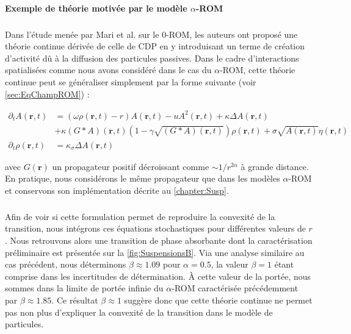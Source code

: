 \paragraph{Exemple de théorie motivée par le modèle $\alpha$-ROM}

\subparagraph{}Dans l'étude menée par Mari et al. \cite{mari_absorbing_2022} sur le $0$-ROM, les auteurs ont proposé une théorie continue dérivée de celle de CDP en y introduisant un terme de création d'activité dû à la diffusion des particules passives. Dans le cadre d'interactions spatialisées comme nous avons considéré dans le cas du $\alpha$-ROM, cette théorie continue peut se généraliser simplement par la forme suivante (voir \autoref{sec:EqChampROM}) :

\begin{equation}
    \begin{aligned}
        \partial_t A (\mathbf{r}, t) &= \left(\omega \rho (\mathbf{r}, t)-r\right) A (\mathbf{r}, t) - uA^2 (\mathbf{r}, t) +\kappa \Delta A (\mathbf{r}, t)\\
        &+ \kappa \left(G\ast A \right)(\mathbf{r}, t)\left(1-\gamma \sqrt{ \left(G\ast A \right)(\mathbf{r}, t)}\right)\rho (\mathbf{r}, t)+ \sigma \sqrt{A (\mathbf{r}, t)}\eta (\mathbf{r}, t)\\
        \partial_t \rho (\mathbf{r}, t) &= \kappa_\sigma \Delta A (\mathbf{r}, t)
    \end{aligned}
\label{eq:SuspensionsB}
\end{equation}

\noindent avec $G(\mathbf{r})$ un propagateur positif décroissant comme $\sim 1/r^{2\alpha}$ à grande distance. En pratique, nous considérons le même propagateur que dans les modèles $\alpha$-ROM et conservons son implémentation décrite au \autoref{chapter:Susp}.

\subparagraph{}Afin de voir si cette formulation permet de reproduire la convexité de la transition, nous intégrons ces équations stochastiques pour différentes valeurs de $r$. Nous retrouvons alors une transition de phase absorbante dont la caractérisation préliminaire est présentée sur la \autoref{fig:SuspensionsB}. Via une analyse similaire au cas précédent, nous déterminons $\beta \approx 1.09$ pour $\alpha = 0.5$, la valeur $\beta = 1$ étant comprise dans les incertitudes de détermination. \`A cette valeur de la portée, nous sommes dans la limite de portée infinie du $\alpha$-ROM caractérisée précédemment par $\beta \approx 1.85$. Ce résultat $\beta \approx 1$ suggère donc que cette théorie continue ne permet pas non plus d'expliquer la convexité de la transition dans le modèle de particules.

